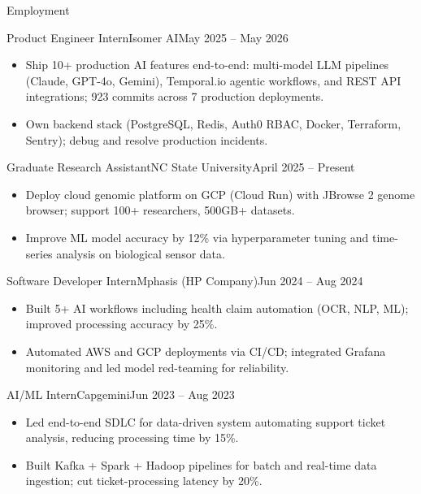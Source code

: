 \documentclass[]{mcdowellcv}
\begin{document}
\makeheader

\begin{cvsection}{Employment}
  \begin{cvsubsection}{Product Engineer Intern}{Isomer AI}{May 2025 -- May 2026}
    \begin{itemize}
      \item Ship 10+ production AI features end-to-end: multi-model LLM pipelines (Claude, GPT-4o, Gemini), Temporal.io agentic workflows, and REST API integrations; 923 commits across 7 production deployments.
      \item Own backend stack (PostgreSQL, Redis, Auth0 RBAC, Docker, Terraform, Sentry); debug and resolve production incidents.
    \end{itemize}
    \vspace{-1.5pt}
  \end{cvsubsection}

  \begin{cvsubsection}{Graduate Research Assistant}{NC State University}{April 2025 -- Present}
    \begin{itemize}
      \item Deploy cloud genomic platform on GCP (Cloud Run) with JBrowse 2 genome browser; support 100+ researchers, 500GB+ datasets.
      \item Improve ML model accuracy by 12\% via hyperparameter tuning and time-series analysis on biological sensor data.
    \end{itemize}
    \vspace{-1.5pt}
  \end{cvsubsection}

  \begin{cvsubsection}{Software Developer Intern}{Mphasis (HP Company)}{Jun 2024 -- Aug 2024}
    \begin{itemize}
      \item Built 5+ AI workflows including health claim automation (OCR, NLP, ML); improved processing accuracy by 25\%.
      \item Automated AWS and GCP deployments via CI/CD; integrated Grafana monitoring and led model red-teaming for reliability.
    \end{itemize}
    \vspace{-1.5pt}
  \end{cvsubsection}

  \begin{cvsubsection}{AI/ML Intern}{Capgemini}{Jun 2023 -- Aug 2023}
    \begin{itemize}
      \item Led end-to-end SDLC for data-driven system automating support ticket analysis, reducing processing time by 15\%.
      \item Built Kafka + Spark + Hadoop pipelines for batch and real-time data ingestion; cut ticket-processing latency by 20\%.
    \end{itemize}
    \vspace{-1.5pt}
  \end{cvsubsection}
\end{cvsection}
\end{document}
